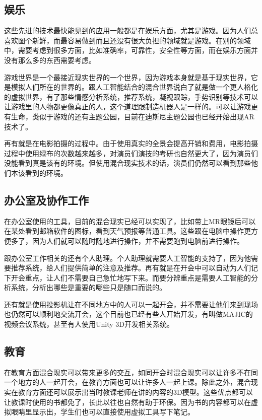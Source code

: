 \documentclass{llncs}
\begin{document}
\subsection{娱乐}
这些先进的技术最快能见到的应用一般都是在娱乐方面，尤其是游戏\cite{kirkley2005creating}。因为人们总喜欢图个新鲜，而最容易做到而且还没有很大负担的领域就是游戏。在别的领域中，需要考虑到很多方面，比如准确率，可靠性，安全性等方面，而在娱乐方面并没有那么多的东西需要考虑。

游戏世界是一个最接近现实世界的一个世界，因为游戏本身就是基于现实世界，它是模拟人们所在的世界的。跟人工智能结合的混合世界说白了就是做一个更人格化的虚拟世界，有了那些情感分析系统，推荐系统，凝视跟踪，手势识别等技术可以让游戏里的人物都更像真正的人，这个道理跟制造机器人是一样的。可以让游戏更有生命，类似于游戏的还有主题公园，目前在迪斯尼主题公园也已经开始出现AR技术了\cite{DBLP:journals/computer/MineBGRY12}。

再有就是在电影拍摄的过程中。由于使用真实的全景会提高开销和费用，电影拍摄过程中使用绿布的次数越来越多，对演员们演技的考研也自然更大了，因为演员们没能看到真是该有的环境。但使用混合现实技术的话，演员们仍然可以看到那些他们本该看到的环境。

\subsection{办公室及协作工作}
在办公室使用的工具，目前的混合现实已经可以实现了，比如带上MR眼镜后可以在某处看到邮箱软件的图标，看到天气预报等普通工具。这些跟在电脑中操作更方便多了，因为人们就可以随时随地进行操作，并不需要跑到电脑前进行操作。

跟办公室工作相关的还有个人助理。个人助理就需要人工智能的支持了，因为他需要推荐系统，给人们提供简单的注意及推荐。再有就是在开会中可以自动为人们记下开会重点，让人们不需要自己急忙地写下来。而要分辨重点是需要人工智能的分析系统，分析出哪些是重要的哪些只是随口而说的。

还有就是使用投影机让在不同地方中的人可以一起开会，并不需要让他们来到现场也仍然可以顺利地交流开会，这个目前也已经有些人开始开发，有叫做MAJIC的视频会议系统\cite{ichikawa1995majic}，甚至有人使用Unity 3D开发相关系统\cite{DBLP:conf/cscw/PejsaKBOW16}。

\subsection{教育}
在教育方面混合现实可以带来更多的交互，如同开会时混合现实可以让许多不在同一个地方的人一起开会，在教育方面也可以让许多人一起上课。除此之外，混合现实在教育方面还可以展示出当时教课老师在讲的内容的3D模型\cite{hughes2005mixed}。这些优点都可以让教课时使用的书都免了，长此以往也自然有助于环保。因为书的内容都可以在虚拟眼睛里显示出，学生们也可以直接使用虚拟工具写下笔记。
\end{document}

